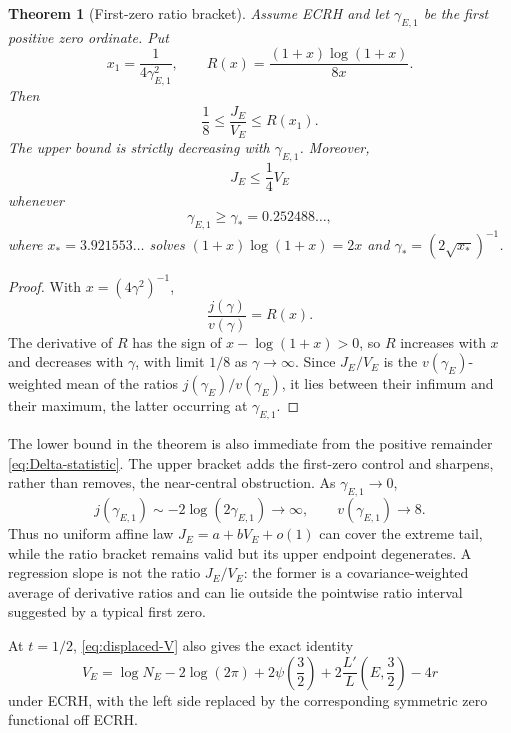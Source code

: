 \documentclass[11pt,reqno]{amsart}
\newtheorem{theorem}{Theorem}
\theoremstyle{remark}
\begin{document}
\begin{theorem}[First-zero ratio bracket]
Assume ECRH and let $\gamma_{E,1}$ be the first positive zero ordinate.  Put
\begin{equation}
  x_1=\frac{1}{4\gamma_{E,1}^2},
  \qquad
  R(x)=\frac{(1+x)\log(1+x)}{8x}.
\end{equation}
Then
\begin{equation}
  \boxed{
  \frac18\le \frac{J_E}{V_E}\le R(x_1).
  }
  \label{eq:ratio-bracket}
\end{equation}
The upper bound is strictly decreasing with $\gamma_{E,1}$.  Moreover,
\begin{equation}
  J_E\le\frac14V_E
\end{equation}
whenever
\begin{equation}
  \gamma_{E,1}\ge\gamma_*=0.252488\ldots,
\end{equation}
where $x_*=3.921553\ldots$ solves $(1+x)\log(1+x)=2x$ and
$\gamma_*=(2\sqrt{x_*})^{-1}$.
\end{theorem}

\begin{proof}
With $x=(4\gamma^2)^{-1}$,
\begin{equation}
  \frac{j(\gamma)}{v(\gamma)}=R(x).
\end{equation}
The derivative of $R$ has the sign of $x-\log(1+x)>0$, so $R$ increases with $x$ and decreases with $\gamma$, with limit $1/8$ as $\gamma\to\infty$.  Since $J_E/V_E$ is the $v(\gamma_E)$-weighted mean of the ratios $j(\gamma_E)/v(\gamma_E)$, it lies between their infimum and their maximum, the latter occurring at $\gamma_{E,1}$.
\end{proof}

The lower bound in the theorem is also immediate from the positive remainder \eqref{eq:Delta-statistic}.  The upper bracket adds the first-zero control and sharpens, rather than removes, the near-central obstruction.  As $\gamma_{E,1}\to0$,
\begin{equation}
  j(\gamma_{E,1})\sim-2\log(2\gamma_{E,1})\to\infty,
  \qquad
  v(\gamma_{E,1})\to8.
\end{equation}
Thus no uniform affine law $J_E=a+bV_E+o(1)$ can cover the extreme tail, while the ratio bracket remains valid but its upper endpoint degenerates.  A regression slope is not the ratio $J_E/V_E$: the former is a covariance-weighted average of derivative ratios and can lie outside the pointwise ratio interval suggested by a typical first zero.

At $t=1/2$, \eqref{eq:displaced-V} also gives the exact identity
\begin{equation}
  \boxed{
  V_E=\log N_E-2\log(2\pi)
  +2\psi\!\left(\frac32\right)
  +2\frac{L'}{L}\!\left(E,\frac32\right)-4r
  }
  \label{eq:V-Euler}
\end{equation}
under ECRH, with the left side replaced by the corresponding symmetric zero functional off ECRH.
\end{document}
